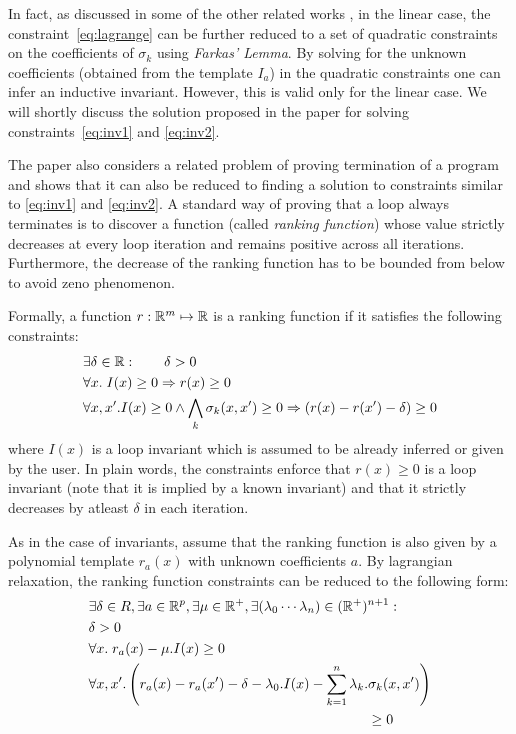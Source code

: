 In fact, as discussed in some of the other related works \cite{ssriram:CAV03,ssriram:SAS04}, in the linear case, the constraint~\ref{eq:lagrange} 
can be further reduced to a set of quadratic constraints on the 
coefficients of $\sigma_k$ using \emph{Farkas' Lemma}. 
By solving for the unknown coefficients (obtained from the template $I_a$) in the
quadratic constraints one can infer an inductive invariant.
However, this is valid only for the linear case. We will shortly discuss
the solution proposed in the paper for solving constraints~\ref{eq:inv1} and \ref{eq:inv2}.

The paper also considers a related problem of proving termination of a program
and shows that it can also be reduced to finding a solution to constraints 
similar to \ref{eq:inv1} and \ref{eq:inv2}. A standard way of proving that 
a loop always terminates is to discover a function (called \emph{ranking function}) whose value strictly decreases at every loop iteration and remains positive across all iterations.
Furthermore, the decrease of the ranking function has to be bounded from below to avoid zeno phenomenon.

Formally, a function $r: \mathbb{R}^m \mapsto \mathbb{R}$ is a ranking function 
if it satisfies the following constraints:
%
\begin{align*}
& \exists \delta \in \mathbb{R}:  \qquad \delta > 0 \\
& \forall x. \; I(x) \ge 0 \Rightarrow r(x) \ge 0 \\
& \forall x,x'. I(x) \ge 0  \wedge \bigwedge_k \sigma_k(x,x') \ge 0 \Rightarrow  
(r(x) - r(x') - \delta) \ge 0
\end{align*}
%
where $I(x)$ is a loop invariant which is assumed to be already inferred 
or given by the user. 
In plain words, the constraints enforce that $r(x) \ge 0$ is a loop invariant 
(note that it is implied by a known invariant) and that it strictly decreases by atleast $\delta$ in each iteration.

As in the case of invariants, assume that the ranking function is also given by
a polynomial template $r_a(x)$ with unknown coefficients $a$. By lagrangian
relaxation, the ranking function constraints can be reduced to the following form:
%
\begin{align}
& \nonumber \exists \delta \in R, \exists a \in \real^p, \exists \mu \in \real^+, \exists (\lambda_0 \cdots \lambda_n) \in (\real^+)^{n+1} :  \\
& \delta > 0 \label{eq:rank1}\\
& \forall x. \; r_a(x) - \mu.I(x)  \ge 0 \label{eq:rank2}\\
\nonumber
& \forall x,x'. \left( r_a(x) - r_a(x') - \delta - \lambda_0.I(x) - \sum \limits_{k=1}^{n} \lambda_k. \sigma_k(x,x') \right) \\ 
& \hspace{200pt} \ge 0  \label{eq:rank3}
\end{align}

